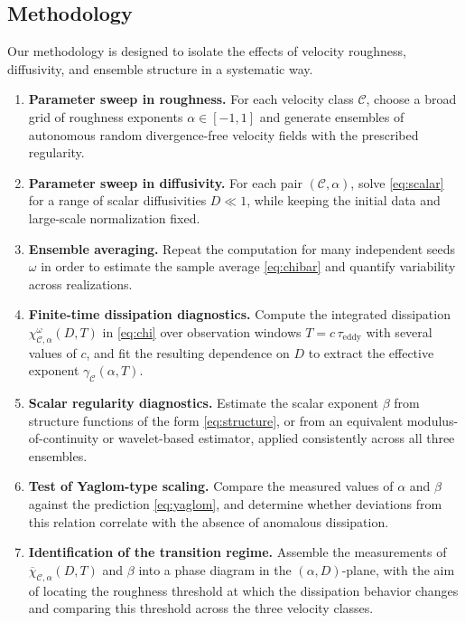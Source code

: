 \subsection{Methodology}

Our methodology is designed to isolate the effects of velocity roughness, diffusivity, and ensemble structure in a systematic way.

\begin{enumerate}
    \item \textbf{Parameter sweep in roughness.}
    For each velocity class $\mathcal{C}$, choose a broad grid of roughness exponents $\alpha\in[-1,1]$ and generate ensembles of autonomous random divergence-free velocity fields with the prescribed regularity.

    \item \textbf{Parameter sweep in diffusivity.}
    For each pair $(\mathcal{C},\alpha)$, solve \eqref{eq:scalar} for a range of scalar diffusivities $D\ll1$, while keeping the initial data and large-scale normalization fixed.

    \item \textbf{Ensemble averaging.}
    Repeat the computation for many independent seeds $\omega$ in order to estimate the sample average \eqref{eq:chibar} and quantify variability across realizations.

    \item \textbf{Finite-time dissipation diagnostics.}
    Compute the integrated dissipation $\chi^{\omega}_{\mathcal{C},\alpha}(D,T)$ in \eqref{eq:chi} over observation windows $T=c\,\tau_{\mathrm{eddy}}$ with several values of $c$, and fit the resulting dependence on $D$ to extract the effective exponent $\gamma_{\mathcal{C}}(\alpha,T)$.

    \item \textbf{Scalar regularity diagnostics.}
    Estimate the scalar exponent $\beta$ from structure functions of the form \eqref{eq:structure}, or from an equivalent modulus-of-continuity or wavelet-based estimator, applied consistently across all three ensembles.

    \item \textbf{Test of Yaglom-type scaling.}
    Compare the measured values of $\alpha$ and $\beta$ against the prediction \eqref{eq:yaglom}, and determine whether deviations from this relation correlate with the absence of anomalous dissipation.

    \item \textbf{Identification of the transition regime.}
    Assemble the measurements of $\overline{\chi}_{\mathcal{C},\alpha}(D,T)$ and $\beta$ into a phase diagram in the $(\alpha,D)$-plane, with the aim of locating the roughness threshold at which the dissipation behavior changes and comparing this threshold across the three velocity classes.
\end{enumerate}

